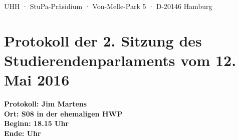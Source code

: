 \documentclass[ngerman,headheight=70pt]{scrartcl}
\begin{document}
    UHH · StuPa-Präsidium · Von-Melle-Park 5 · D-20146 Hamburg

    \section*{Protokoll der 2. Sitzung des Studierendenparlaments vom 12. Mai 2016}

    \textbf{Protokoll: Jim Martens}\\
    \textbf{Ort: S08 in der ehemaligen HWP}\\
    \textbf{Beginn: 18.15 Uhr}\\
    \textbf{Ende:  Uhr}

    \vspace{0.5cm}
\end{document}
